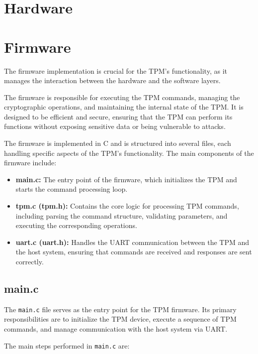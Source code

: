 \section{Hardware}



\section{Firmware}
The firmware implementation is crucial for the TPM's 
functionality, as it manages the interaction between 
the hardware and the software layers. 

The firmware is responsible for executing the TPM commands, 
managing the cryptographic operations, 
and maintaining the internal state of the TPM.
It is designed to be efficient and secure, ensuring that
the TPM can perform its functions without exposing
sensitive data or being vulnerable to attacks.

The firmware is implemented in C and is structured into 
several files, each handling specific aspects of the TPM's
functionality. The main components of the firmware include:
\begin{itemize}
    \item \textbf{main.c:} The entry point of the firmware,
    which initializes the TPM and starts the command
    processing loop.
    \item \textbf{tpm.c (tpm.h):} Contains the core logic for
    processing TPM commands, including parsing the
    command structure, validating parameters, and
    executing the corresponding operations.
    \item \textbf{uart.c (uart.h):} Handles the UART communication
    between the TPM and the host system, ensuring that
    commands are received and responses are sent correctly.
\end{itemize}


\subsection{main.c}

The \texttt{main.c} file serves as the entry point for 
the TPM firmware. Its primary responsibilities are to 
initialize the TPM device, execute a sequence of TPM 
commands, and manage communication with the host system 
via UART. 

The main steps performed in \texttt{main.c} are:

